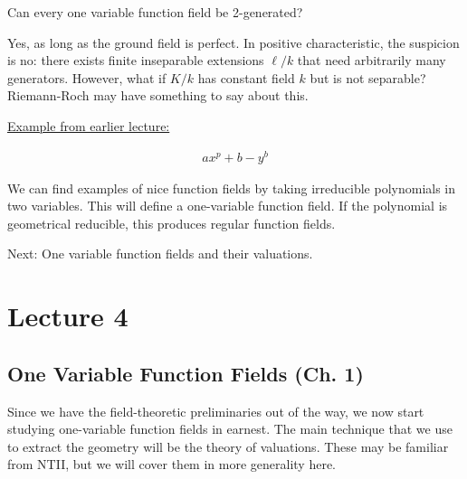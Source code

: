 \begin{question}

Can every one variable function field be 2-generated?

\end{question}

\begin{answer}

Yes, as long as the ground field is perfect. In positive characteristic,
the suspicion is no: there exists finite inseparable extensions
\(\ell/k\) that need arbitrarily many generators. However, what if
\(K/k\) has constant field \(k\) but is not separable? Riemann-Roch may
have something to say about this.

\end{answer}

\begin{example}

\hyperref[technical_example]{Example from earlier lecture:}

\begin{align*}
ax^p + b - y^b
\end{align*}

\end{example}

\begin{remark}

We can find examples of nice function fields by taking irreducible
polynomials in two variables. This will define a one-variable function
field. If the polynomial is geometrical reducible, this produces regular
function fields.

\end{remark}

Next: One variable function fields and their valuations.

\hypertarget{lecture-4}{%
\section{Lecture 4}\label{lecture-4}}

\hypertarget{one-variable-function-fields-ch.-1}{%
\subsection{One Variable Function Fields (Ch.
1)}\label{one-variable-function-fields-ch.-1}}

Since we have the field-theoretic preliminaries out of the way, we now
start studying one-variable function fields in earnest. The main
technique that we use to extract the geometry will be the theory of
valuations. These may be familiar from NTII, but we will cover them in
more generality here.

